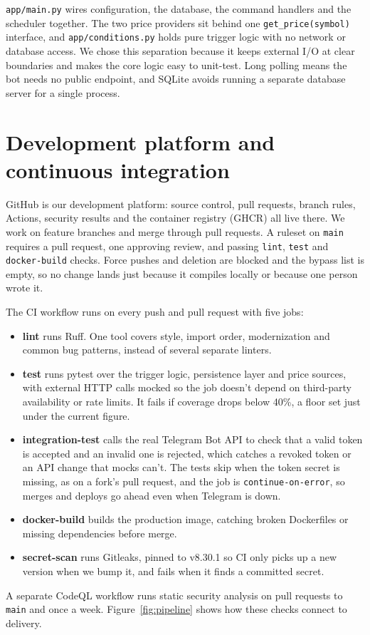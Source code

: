 \documentclass[11pt,a4paper]{article}
\begin{document}
\texttt{app/main.py} wires configuration, the database, the command handlers and the scheduler together. The two price providers sit behind one \texttt{get\_price(symbol)} interface, and \texttt{app/conditions.py} holds pure trigger logic with no network or database access. We chose this separation because it keeps external I/O at clear boundaries and makes the core logic easy to unit-test. Long polling means the bot needs no public endpoint, and SQLite avoids running a separate database server for a single process.

\section{Development platform and continuous integration}

GitHub is our development platform: source control, pull requests, branch rules, Actions, security results and the container registry (GHCR) all live there. We work on feature branches and merge through pull requests. A ruleset on \texttt{main} requires a pull request, one approving review, and passing \texttt{lint}, \texttt{test} and \texttt{docker-build} checks. Force pushes and deletion are blocked and the bypass list is empty, so no change lands just because it compiles locally or because one person wrote it.

The CI workflow runs on every push and pull request with five jobs:
\begin{itemize}
  \item \textbf{lint} runs Ruff. One tool covers style, import order, modernization and common bug patterns, instead of several separate linters.
  \item \textbf{test} runs pytest over the trigger logic, persistence layer and price sources, with external HTTP calls mocked so the job doesn't depend on third-party availability or rate limits. It fails if coverage drops below 40\%, a floor set just under the current figure.
  \item \textbf{integration-test} calls the real Telegram Bot API to check that a valid token is accepted and an invalid one is rejected, which catches a revoked token or an API change that mocks can't. The tests skip when the token secret is missing, as on a fork's pull request, and the job is \texttt{continue-on-error}, so merges and deploys go ahead even when Telegram is down.
  \item \textbf{docker-build} builds the production image, catching broken Dockerfiles or missing dependencies before merge.
  \item \textbf{secret-scan} runs Gitleaks, pinned to v8.30.1 so CI only picks up a new version when we bump it, and fails when it finds a committed secret.
\end{itemize}
A separate CodeQL workflow runs static security analysis on pull requests to \texttt{main} and once a week. Figure~\ref{fig:pipeline} shows how these checks connect to delivery.
\end{document}
